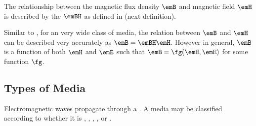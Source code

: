 The relationship between the magnetic flux density $\emB$
and magnetic field $\emH$ is described by the  $\emBH$
as defined in  (next definition).

\begin{remark}
   Similar to , for an very wide class of media, the relation between $\emB$ and $\emH$
   can be described very accurately as $\emB = \emBH \emH$.
   However in general, $\emB$ is a function of both $\emH$ and $\emE$ such that
   $\emB = \fg(\emH,\emE)$ for some function $\fg$.
\end{remark}

\begin{definition}
\label{def:bh}
\end{definition}

\subsection{Types of Media}
Electromagnetic waves propagate through a .
A media may be classified according to whether it is , , 
, ,
or .

\begin{definition}
\label{def_simple}
\end{definition}


